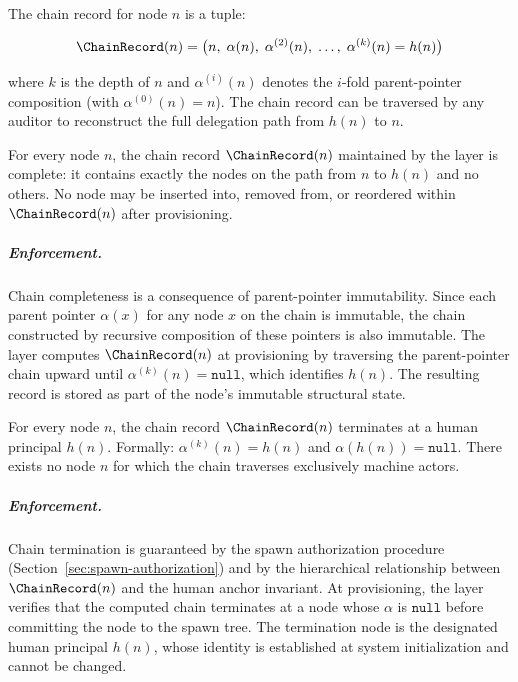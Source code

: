 The chain record for node $n$ is a tuple:

\begin{equation}
\ChainRecord(n) = \bigl( n,\; \alpha(n),\; \alpha^{(2)}(n),\; \ldots,\; \alpha^{(k)}(n) = h(n) \bigr)
\label{eq:chain-record}
\end{equation}

where $k$ is the depth of $n$ and $\alpha^{(i)}(n)$ denotes the $i$-fold parent-pointer composition (with $\alpha^{(0)}(n) = n$). The chain record can be traversed by any auditor to reconstruct the full delegation path from $h(n)$ to $n$.

\begin{invariant}\label{inv:chain-completeness}
For every node $n$, the chain record $\ChainRecord(n)$ maintained by the \fact{} layer is complete: it contains exactly the nodes on the path from $n$ to $h(n)$ and no others. No node may be inserted into, removed from, or reordered within $\ChainRecord(n)$ after provisioning.
\end{invariant}

\subparagraph{Enforcement.} Chain completeness is a consequence of parent-pointer immutability. Since each parent pointer $\alpha(x)$ for any node $x$ on the chain is immutable, the chain constructed by recursive composition of these pointers is also immutable. The \fact{} layer computes $\ChainRecord(n)$ at provisioning by traversing the parent-pointer chain upward until $\alpha^{(k)}(n) = \texttt{null}$, which identifies $h(n)$. The resulting record is stored as part of the node's immutable structural state.

\begin{invariant}\label{inv:chain-termination}
For every node $n$, the chain record $\ChainRecord(n)$ terminates at a human principal $h(n)$. Formally: $\alpha^{(k)}(n) = h(n)$ and $\alpha(h(n)) = \texttt{null}$. There exists no node $n$ for which the chain traverses exclusively machine actors.
\end{invariant}

\subparagraph{Enforcement.} Chain termination is guaranteed by the spawn authorization procedure (Section~\ref{sec:spawn-authorization}) and by the hierarchical relationship between $\ChainRecord(n)$ and the human anchor invariant. At provisioning, the \fact{} layer verifies that the computed chain terminates at a node whose $\alpha$ is $\texttt{null}$ before committing the node to the spawn tree. The termination node is the designated human principal $h(n)$, whose identity is established at system initialization and cannot be changed.

